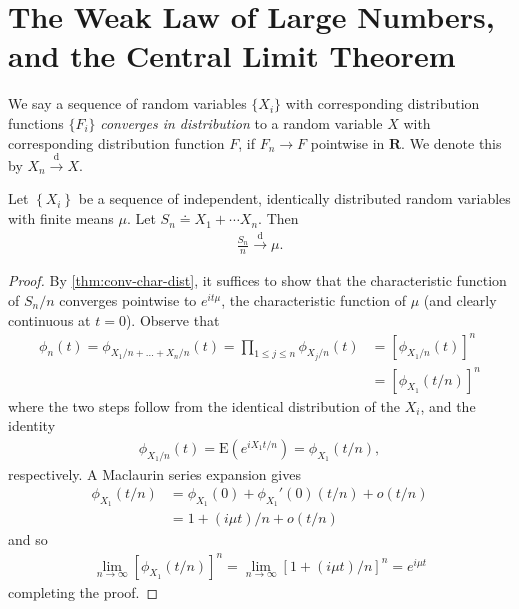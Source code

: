 \section{The Weak Law of Large Numbers, and the Central Limit Theorem}
\begin{definition}
	We say a sequence of random variables $\{X_{i}\}$
	with corresponding distribution functions $\{F_{i}\}$
	\emph{converges in distribution} to a random variable $X$ with corresponding
	distribution function $F$, if $F_{n} \to F$ pointwise in $\mathbf{R}$.
	We denote this by $X_{n} \xrightarrow{\text{d}} X$.
\end{definition}
\begin{theorem}\label{thm:weak-law}
	Let $\left\{ X_{i} \right\}$ be a sequence of independent, identically
	distributed random variables with finite means $\mu$. Let
	$S_{n} \doteq X_{1} + \cdots X_{n}$. Then
	\begin{equation*}
		\begin{split}
			\frac{S_{n}}{n} \xrightarrow{\text{d}} \mu.
		\end{split}
	\end{equation*}
\end{theorem}
\begin{proof}
	By \cref{thm:conv-char-dist}, it suffices to show that
	the characteristic function of $S_{n}/n$ converges
	pointwise to  $e^{it \mu}$, the characteristic function of $\mu$ (and clearly
	continuous at $t=0$). Observe that
	\begin{equation*}
		\begin{split}
			\phi_{n}(t) = \phi_{X_{1}/n + \dots + X_{n}/n}(t)
			= \prod_{1 \le j \le n} \phi_{X_{j}/n}(t)
			& = \left[ \phi_{X_{1}/n}(t) \right]^{n}
			\\
			& = \left[ \phi_{X_{1}}(t/n) \right]^{n}
		\end{split}
	\end{equation*}
	where the two steps follow from the identical distribution of the $X_{i}$,
	and the identity
	\begin{equation*}
		\begin{split}
			\phi_{X_{1}/n}(t) = \mathrm{E}(e^{i X_{1} t /n}) = \phi_{X_{1}}(t/n),
		\end{split}
	\end{equation*}
	respectively. A Maclaurin series expansion gives
	\begin{equation*}
		\begin{split}
			\phi_{X_{1}}(t/n) & = \phi_{X_{1}}(0) + \phi_{X_{1}}'(0)(t/n) + o(t/n)
			\\
			& = 1 + (i \mu t)/n + o(t/n)
		\end{split}
	\end{equation*}
	and so
	\begin{equation*}
		\begin{split}
			\lim_{n \to \infty} \left[ \phi_{X_{1}}(t/n) \right]^{n}
			= \lim_{n \to \infty} \left[ 1 + (i \mu t)/n \right]^{n} = e^{i \mu t}
		\end{split}
	\end{equation*}
	completing the proof.
\end{proof}
